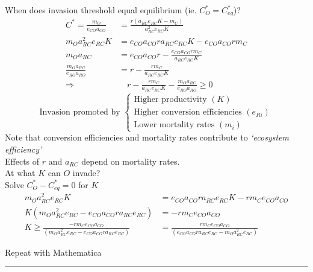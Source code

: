 \documentclass{article}
\newcommand{\note}[1]{\colorbox{gray!30}{#1}}
\newcommand{\ind}{\-\hspace{1cm}}
\begin{document}
\ind When does invasion threshold equal equilibrium (ie. $C_O^* = C_{eq}^*$)?
\begin{align*}
	C^* = \frac{m_O}{e_{CO}a_{CO}} &= \frac{r(a_{RC}e_{RC}K-m_C)}{a_{RC}^2 e_{RC} K}\\
	m_O a_{RC}^2 e_{RC} K &= e_{CO} a_{CO} r a_{RC} e_{RC} K - e_{CO} a_{CO} r m_C\\
	m_O a_{RC}  & = e_{CO} a_{CO} r - \frac{e_{CO} a_{CO} r m_C}{a_{RC}e_{RC} K}\\
	\frac{m_O a_{RC}}{e_{RO} a_{RO}}  & = r - \frac{ r m_C}{a_{RC}e_{RC} K}\\
	\Rightarrow & \quad   r - \frac{ r m_C}{a_{RC}e_{RC} K} - \frac{m_O a_{RC}}{e_{RO} a_{RO}}  \geq 0
\end{align*}
\begin{equation*}
\text{Invasion promoted by }\begin{cases}
\text{Higher productivity }(K)\\
\text{Higher conversion efficiencies }(e_{Ri})\\
\text{Lower mortality rates }(m_i)
\end{cases}
\end{equation*}
\ind \ind Note that conversion efficiencies and mortality rates contribute to \emph{`ecosystem efficiency'}\\
\ind \ind Effects of $r$ and $a_{RC}$ depend on mortality rates.\\

At what $K$ can $O$ invade?\\
\ind Solve $C_O^* - C_{eq}^* = 0$ for $K$
\begin{align*}
	m_O a_{RC}^2 e_{RC} K &= e_{CO} a_{CO} r a_{RC} e_{RC} K - r m_C e_{CO} a_{CO} \\
	K(m_O a_{RC}^2 e_{RC}-e_{CO} a_{CO} r a_{RC} e_{RC}) & =  - r m_C e_{CO} a_{CO} \\
	K  \geq   \frac{- r m_C e_{CO} a_{CO}}{(m_O a_{RC}^2 e_{RC}-e_{CO} a_{CO} r a_{RC} e_{RC})} & =  \frac{r m_C e_{CO} a_{CO}}{(e_{CO} a_{CO} r a_{RC} e_{RC}-m_O a_{RC}^2 e_{RC})}
\end{align*}

\note{Repeat with Mathematica}


\rule[0.5ex]{\linewidth}{1pt}
\end{document}
